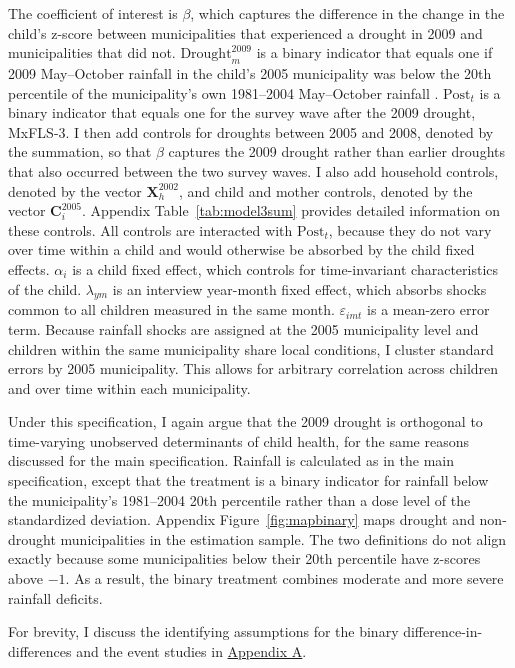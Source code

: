 The coefficient of interest is $\beta$, which captures the difference in the change in the child's z-score between municipalities that experienced a drought in 2009 and municipalities that did not. $\text{Drought}_m^{2009}$ is a binary indicator that equals one if 2009 May--October rainfall in the child's 2005 municipality was below the 20th percentile of the municipality's own 1981--2004 May--October rainfall \parencite{shahDroughtOpportunitiesContemporaneous2017}. $\text{Post}_t$ is a binary indicator that equals one for the survey wave after the 2009 drought, MxFLS-3. I then add controls for droughts between 2005 and 2008, denoted by the summation, so that $\beta$ captures the 2009 drought rather than earlier droughts that also occurred between the two survey waves. I also add household controls, denoted by the vector $\mathbf{X}_h^{2002}$, and child and mother controls, denoted by the vector $\mathbf{C}_i^{2005}$. Appendix Table~\ref{tab:model3sum} provides detailed information on these controls. All controls are interacted with $\text{Post}_t$, because they do not vary over time within a child and would otherwise be absorbed by the child fixed effects. $\alpha_i$ is a child fixed effect, which controls for time-invariant characteristics of the child. $\lambda_{ym}$ is an interview year-month fixed effect, which absorbs shocks common to all children measured in the same month. $\varepsilon_{imt}$ is a mean-zero error term. Because rainfall shocks are assigned at the 2005 municipality level and children within the same municipality share local conditions, I cluster standard errors by 2005 municipality. This allows for arbitrary correlation across children and over time within each municipality.

Under this specification, I again argue that the 2009 drought is orthogonal to time-varying unobserved determinants of child health, for the same reasons discussed for the main specification. Rainfall is calculated as in the main specification, except that the treatment is a binary indicator for rainfall below the municipality's 1981--2004 20th percentile rather than a dose level of the standardized deviation. Appendix Figure~\ref{fig:mapbinary} maps drought and non-drought municipalities in the estimation sample. The two definitions do not align exactly because some municipalities below their 20th percentile have z-scores above $-1$. As a result, the binary treatment combines moderate and more severe rainfall deficits.

For brevity, I discuss the identifying assumptions for the binary difference-in-differences and the event studies in \hyperref[app:binary]{Appendix A}.

